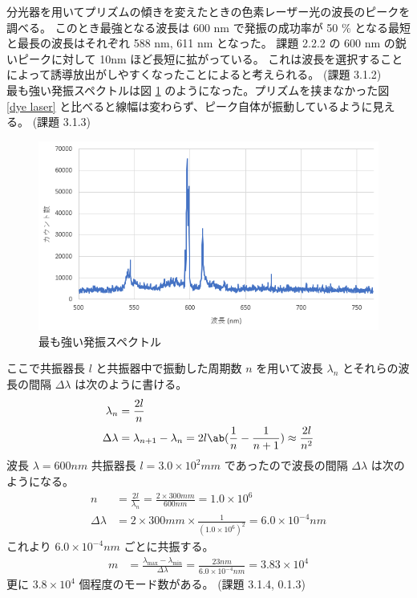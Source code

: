 \documentclass[uplatex,dvipdfmx,a4paper,11pt]{jlreq}
\numberwithin{equation}{section}
\theoremstyle{definition}
\begin{document}
分光器を用いてプリズムの傾きを変えたときの色素レーザー光の波長のピークを調べる。
このとき最強となる波長は 600 \si{nm} で発振の成功率が 50 \% となる最短と最長の波長はそれぞれ 588 \si{nm}, 611 \si{nm} となった。
課題 2.2.2 の 600 \si{nm} の鋭いピークに対して 10\si{nm} ほど長短に拡がっている。
これは波長を選択することによって誘導放出がしやすくなったことによると考えられる。
(課題 3.1.2) \\

最も強い発振スペクトルは図 \ref{prism strongest} のようになった。プリズムを挟まなかった図 \ref{dye laser} と比べると線幅は変わらず、ピーク自体が振動しているように見える。 (課題 3.1.3) \\
\begin{figure}[htbp]
  \centering
  \includegraphics[width=12cm]{./assets/prism_strongest.png}
  \caption{最も強い発振スペクトル}
  \label{prism strongest}
\end{figure}

ここで共振器長 $l$ と共振器中で振動した周期数 $n$ を用いて波長 $\lambda_n$ とそれらの波長の間隔 $\Delta\lambda$ は次のように書ける。
\begin{align}
  \lambda_n     & = \frac{2l}{n}                                                                          \\
  \Delta\lambda & = \lambda_{n+1} - \lambda_n = 2l\ab(\frac{1}{n} - \frac{1}{n+1}) \approx \frac{2l}{n^2}
\end{align}
波長 $\lambda = 600\si{nm}$ 共振器長 $l = 3.0 \times 10^2\si{mm}$ であったので波長の間隔 $\Delta\lambda$ は次のようになる。
\begin{align}
  n             & = \frac{2l}{\lambda_n} = \frac{2\times 300\si{mm}}{600\si{nm}} = 1.0\times 10^6   \\
  \Delta\lambda & = 2\times 300\si{mm}\times\frac{1}{(1.0\times 10^6)^2} = 6.0\times 10^{-4}\si{nm}
\end{align}
これより $6.0\times 10^{-4}\si{nm}$ ごとに共振する。
\begin{align}
  m & = \frac{\lambda_{\max} - \lambda_{\min}}{\Delta\lambda} = \frac{23\si{nm}}{6.0\times 10^{-4}\si{nm}} = 3.83\times 10^4
\end{align}
更に $3.8\times 10^4$ 個程度のモード数がある。
(課題 3.1.4, 0.1.3) \\
\end{document}

